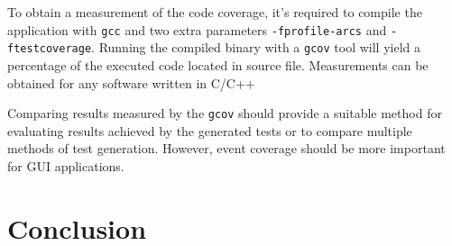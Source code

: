 To obtain a measurement of the code coverage, it's required to compile the application with \verb|gcc| and two extra parameters \verb|-fprofile-arcs| and \verb|-ftestcoverage|. Running the compiled binary with a \verb|gcov| tool will yield a percentage of the executed code located in source file. Measurements can be obtained for any software written in C/C++\cite{gcov}

Comparing results measured by the \verb|gcov| should provide a suitable method for evaluating results achieved by the generated tests or to compare multiple methods of test generation. However, event coverage should be more important for GUI applications.



\chapter{Conclusion}